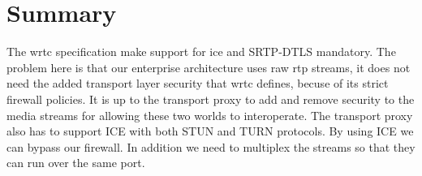 \section{Summary}
The \gls{wrtc} specification make support for \gls{ice} and SRTP-DTLS mandatory. The problem here is that our enterprise architecture uses raw \gls{rtp} streams, it does not need the added transport layer security that \gls{wrtc} defines, becuse of its strict firewall policies. It is up to the transport proxy to add and remove security to the media streams for allowing these two worlds to interoperate. The transport proxy also has to support ICE with both STUN and TURN protocols. By using ICE we can bypass our firewall. In addition we need to multiplex the streams so that they can run over the same port.